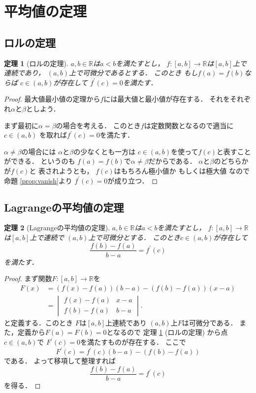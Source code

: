 \documentclass[leqno, a4paper, 12pt]{jsarticle}
\newtheorem{thm}{定理}
\newcommand{\rr}{\mathbb{R}}
\newcommand{\bibun}[1]{#1^{\prime}}
\begin{document}
\section{平均値の定理}
\subsection{ロルの定理}

\begin{thm}[ロルの定理]\label{thm:rolle}
$a, b\in \rr$は$a<b$を満たすとし，
$f: [a, b]\to \rr$は$[a, b]$上で連続であり，
$(a, b)$上で可微分であるとする．
このとき
もし$f(a)=f(b)$ならば
$c\in (a, b)$が存在して
$\bibun{f}(c)=0$を満たす．
\end{thm}
\begin{proof}
最大値最小値の定理から$f$には最大値と最小値が存在する．
それをそれぞれ$\alpha$と$\beta$としよう．

まず最初に$\alpha=\beta$の場合を考える．
このとき$f$は定数関数となるので適当に$c\in (a, b)$
を取れば$\bibun{f}(c)=0$を満たす．

$\alpha\neq \beta$の場合には
$\alpha$と$\beta$の少なくとも一方は
$c\in (a, b)$を使って$f(c)$と表すことができる．
というのも
$f(a)=f(b)$で$\alpha\neq \beta$だからである．
$\alpha$と$\beta$のどちらかが$f(c)$と
表されようとも，
$f(c)$はもちろん極小値か
もしくは極大値
なので命題 \ref{prop:vanish}より
$\bibun{f}(c)=0$が成り立つ．
\end{proof}

\subsection{Lagrangeの平均値の定理}


\begin{thm}[Lagrangeの平均値の定理]
$a, b\in \rr$は$a<b$を満たすとし，
$f: [a, b]\to \rr$は$[a, b]$上で連続で
$(a, b)$上で可微分とする．
このとき$c\in (a, b)$が存在して
\[
\frac{f(b)-f(a)}{b-a}=\bibun{f}(c)
\]
を満たす．
\end{thm}
\begin{proof}

まず関数$F: [a, b]\to \rr$を
\begin{align*}
F(x)&=(f(x)-f(a))(b-a)-(f(b)-f(a))(x-a)\\
&=
\begin{vmatrix}
f(x)-f(a) & x-a\\
f(b)-f(a) & b-a
\end{vmatrix}. 
\end{align*}
と定義する．このとき
$F$は$[a, b]$上連続であり
$(a, b)$上$F$は可微分である．
また，定義から$F(a)=F(b)=0$となるので
定理 \ref{thm:rolle} (ロルの定理)
から点$c\in (a, b)$で
$\bibun{F}(c)=0$を満たすものが存在する．
ここで
\[
\bibun{F}(c)=\bibun{f}(c)(b-a)
-(f(b)-f(a))
\]
である．
よって移項して整理すれば
\[
\frac{f(b)-f(a)}{b-a}=f^{\prime}(c)
\]
を得る．
\end{proof}
\end{document}
